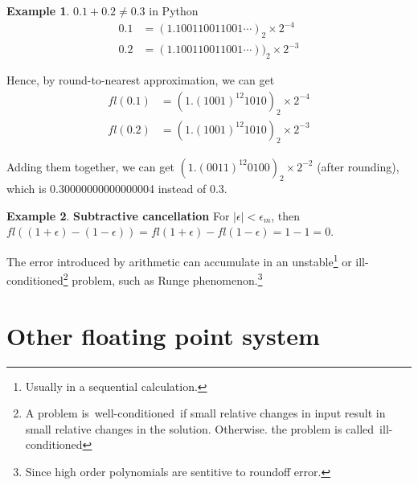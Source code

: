 \documentclass[12pt,a4paper]{extarticle}
\numberwithin{equation}{section}
\numberwithin{figure}{section}
\numberwithin{table}{section}
\theoremstyle{definition}
\newtheorem{example}{Example}
\begin{document}
\begin{example}
    $0.1+0.2\neq 0.3$ in Python
    \begin{equation}
        \begin{split}
            0.1 &= (1.100110011001\cdots)_2\times 2^{-4}\\
            0.2 &= (1.100110011001\cdots))_2\times 2^{-3}    
        \end{split}
    \end{equation}
    
    Hence, by round-to-nearest approximation, we can get
    \begin{equation}
        \begin{split}
            fl(0.1) &= (1.(1001)^{12}1010)_2\times 2^{-4}\\
            fl(0.2) &= (1.(1001)^{12}1010)_2\times 2^{-3}    
        \end{split}
    \end{equation}

    Adding them together, we can get $(1.(0011)^{12} 0100)_2\times 2^{-2}$ (after rounding),  which is 0.30000000000000004 instead of 0.3.
\end{example}

\begin{example}
    {\bf Subtractive cancellation} 
    For $|\epsilon|<\epsilon_m$, then $fl((1+\epsilon)-(1-\epsilon))=fl(1+\epsilon)-fl(1-\epsilon)=1-1=0$. 
\end{example}

The error introduced by arithmetic can accumulate in an unstable\footnote{\scriptsize Usually in a sequential calculation.} or ill-conditioned\footnote{\scriptsize A problem is well-conditioned if small relative changes in input result in small relative changes in the solution. Otherwise. the problem is called ill-conditioned} problem, such as Runge phenomenon.\footnote{\scriptsize Since high order polynomials are sentitive to roundoff error.}

\section{Other floating point system}
\end{document}
